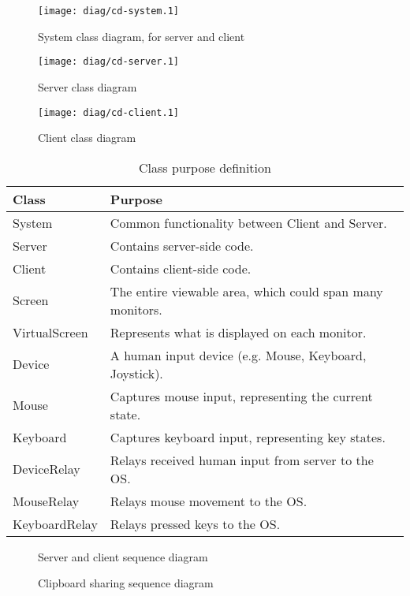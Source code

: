 \begin{figure}[ht!]
  \begin{center}
    \texttt{[image: diag/cd-system.1]}
    \caption{System class diagram, for server and client}
    \label{fig:systemClassDiagram}
  \end{center}
\end{figure}

\begin{figure}[ht!]
  \begin{center}
    \texttt{[image: diag/cd-server.1]}
    \caption{Server class diagram}
    \label{fig:serverClassDiagram}
  \end{center}
\end{figure}

\begin{figure}[ht!]
  \begin{center}
    \texttt{[image: diag/cd-client.1]}
    \caption{Client class diagram}
    \label{fig:clientClassDiagram}
  \end{center}
\end{figure}

\begin{table}[ht!]
  \begin{tabular}{|l|l|}
    \hline
    \textbf{Class} & \textbf{Purpose} \\
    \hline
    System & Common functionality between Client and Server. \\
    Server & Contains server-side code. \\
    Client & Contains client-side code. \\
    Screen & The entire viewable area, which could span many monitors. \\
    VirtualScreen & Represents what is displayed on each monitor. \\
    Device & A human input device (e.g. Mouse, Keyboard, Joystick). \\
    Mouse & Captures mouse input, representing the current state. \\
    Keyboard & Captures keyboard input, representing key states. \\
    DeviceRelay & Relays received human input from server to the OS. \\
    MouseRelay & Relays mouse movement to the OS. \\
    KeyboardRelay & Relays pressed keys to the OS. \\
    \hline
  \end{tabular}
  \caption{Class purpose definition}
  \label{tab:classes}
\end{table}

\begin{figure}
  \centering
  
  \caption{Server and client sequence diagram}
\end{figure}

\begin{figure}
  \centering
  
  \caption{Clipboard sharing sequence diagram}
\end{figure}
